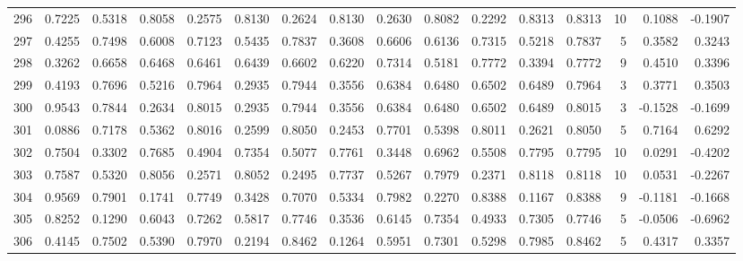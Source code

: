 \begin{tabular}{lrrrrrrrrrrrrrrr}
296 &      0.7225 &  0.5318 &  0.8058 &  0.2575 &  0.8130 &  0.2624 &  0.8130 &  0.2630 &  0.8082 &  0.2292 &   0.8313 &     0.8313 &     10 &                    0.1088 &                    -0.1907 \\
297 &      0.4255 &  0.7498 &  0.6008 &  0.7123 &  0.5435 &  0.7837 &  0.3608 &  0.6606 &  0.6136 &  0.7315 &   0.5218 &     0.7837 &      5 &                    0.3582 &                     0.3243 \\
298 &      0.3262 &  0.6658 &  0.6468 &  0.6461 &  0.6439 &  0.6602 &  0.6220 &  0.7314 &  0.5181 &  0.7772 &   0.3394 &     0.7772 &      9 &                    0.4510 &                     0.3396 \\
299 &      0.4193 &  0.7696 &  0.5216 &  0.7964 &  0.2935 &  0.7944 &  0.3556 &  0.6384 &  0.6480 &  0.6502 &   0.6489 &     0.7964 &      3 &                    0.3771 &                     0.3503 \\
300 &      0.9543 &  0.7844 &  0.2634 &  0.8015 &  0.2935 &  0.7944 &  0.3556 &  0.6384 &  0.6480 &  0.6502 &   0.6489 &     0.8015 &      3 &                   -0.1528 &                    -0.1699 \\
301 &      0.0886 &  0.7178 &  0.5362 &  0.8016 &  0.2599 &  0.8050 &  0.2453 &  0.7701 &  0.5398 &  0.8011 &   0.2621 &     0.8050 &      5 &                    0.7164 &                     0.6292 \\
302 &      0.7504 &  0.3302 &  0.7685 &  0.4904 &  0.7354 &  0.5077 &  0.7761 &  0.3448 &  0.6962 &  0.5508 &   0.7795 &     0.7795 &     10 &                    0.0291 &                    -0.4202 \\
303 &      0.7587 &  0.5320 &  0.8056 &  0.2571 &  0.8052 &  0.2495 &  0.7737 &  0.5267 &  0.7979 &  0.2371 &   0.8118 &     0.8118 &     10 &                    0.0531 &                    -0.2267 \\
304 &      0.9569 &  0.7901 &  0.1741 &  0.7749 &  0.3428 &  0.7070 &  0.5334 &  0.7982 &  0.2270 &  0.8388 &   0.1167 &     0.8388 &      9 &                   -0.1181 &                    -0.1668 \\
305 &      0.8252 &  0.1290 &  0.6043 &  0.7262 &  0.5817 &  0.7746 &  0.3536 &  0.6145 &  0.7354 &  0.4933 &   0.7305 &     0.7746 &      5 &                   -0.0506 &                    -0.6962 \\
306 &      0.4145 &  0.7502 &  0.5390 &  0.7970 &  0.2194 &  0.8462 &  0.1264 &  0.5951 &  0.7301 &  0.5298 &   0.7985 &     0.8462 &      5 &                    0.4317 &                     0.3357 \\

\end{tabular}
